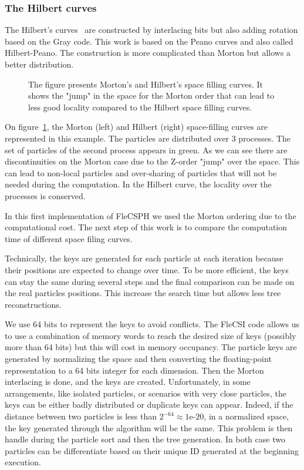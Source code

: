 \subsubsection*{The Hilbert curves} The Hilbert's curves~\cite{sagan2012space} are constructed by interlacing bits but also adding rotation based on the Gray code.
This work is based on the Peano curves and also called Hilbert-Peano. 
The construction is more complicated than Morton but allows a better distribution. 

\begin{figure}[t!]
\centering

\caption[Morton and Hilbert space filling curves.]{The figure presents Morton's and Hilbert's space filling curves. It shows the "jump" in the space for the Morton order that can lead to less good locality compared to the Hilbert space filling curves.}
\label{fig:space_filling}
\end{figure}

On figure~\ref{fig:space_filling}, the Morton (left) and Hilbert (right) space-filling curves are represented in this example.
The particles are distributed over 3 processes. 
The set of particles of the second process appears in green. 
As we can see there are discontinuities on the Morton case due to the Z-order "jump" over the space. 
This can lead to non-local particles and over-sharing of particles that will not be needed during the computation.
In the Hilbert curve, the locality over the processes is conserved.

In this first implementation of FleCSPH we used the Morton ordering due to the computational cost. 
The next step of this work is to compare the computation time of different space filing curves. 

Technically, the keys are generated for each particle at each iteration because their positions are expected to change over time. 
To be more efficient, the keys can stay the same during several steps and the final comparison can be made on the real particles positions. 
This increase the search time but allows less tree reconstructions.

We use 64 bits to represent the keys to avoid conflicts.
The FleCSI code allows us to use a combination of memory words to reach the desired size of keys (possibly more than 64 bits) but this will cost in memory occupancy. 
The particle keys are generated by normalizing the space and then converting the floating-point representation to a 64 bits integer for each dimension. 
Then the Morton interlacing is done, and the keys are created. 
Unfortunately, in some arrangements, like isolated particles, or scenarios with very close particles, the keys can be either badly distributed or duplicate keys can appear. 
Indeed, if the distance between two particles is less than $2^{-64} \approx 1$e-$20$, in a normalized space, the key generated through the algorithm will be the same. 
This problem is then handle during the particle sort and then the tree generation. 
In both case two particles can be differentiate based on their unique ID generated at the beginning execution. 

